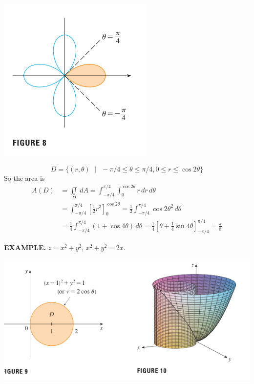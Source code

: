 \documentclass{article}
\begin{document}
\begin{minipage}[]{0.3\linewidth}
  \includegraphics[width=4.3 cm]{images/2022-04-03-18-29-01.png}
\end{minipage}
\begin{minipage}[]{0.67\linewidth}
  \[D = \{(r, \theta) \text{ }  | \text{ } -\pi/4 \le \theta \le \pi/4, 0 \le r \le \cos{2\theta }\}\]
  So the area is 
    \begin{equation*}
        \begin{split}
            A(D) & = \iint \limits_{D }\, dA = \int_{- \pi / 4 }^{\pi / 4   } \int_0^{\cos{2\theta}} r \,dr\,d\theta \\ 
                 & =\int_{- \pi / 4 }^{\pi / 4   }  \left[ \frac{1}{2}r^2  \right]_0^{\cos{2\theta}} = \frac{1}{2}\int_{- \pi / 4 }^{\pi / 4   }  \cos{2\theta}^2 \, d\theta \\ 
                 & = \frac{1}{4} \int_{- \pi / 4 }^{\pi / 4   } ( 1 + \cos{4 \theta }) \, d\theta = \frac{1}{4}  \left[ \theta + \frac{1}{4} \sin{4 \theta } \right]_{- \pi /4 }^{\pi / 4    } = \frac{\pi }{ 8 }
        \end{split}
    \end{equation*}
    
  \end{minipage}
 
  {\selectfont \textbf{\textcolor{blue5}{ EXAMPLE.}}}  $z = x^2 + y^2 $, $x^2 + y^2 = 2x $.

  \begin{center}
\includegraphics[width=10 cm]{images/2022-04-04-14-21-24.png}
    \end{center}  
\end{document}
